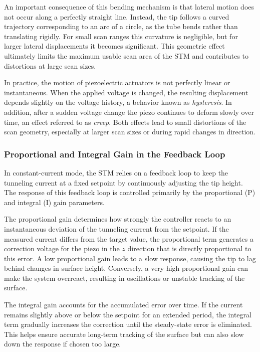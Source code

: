\documentclass[a4paper]{article}
\begin{document}
An important consequence of this bending mechanism is that lateral motion does not occur along a perfectly straight line.
Instead, the tip follows a curved trajectory corresponding to an arc of a circle, as the tube bends rather than translating rigidly.
For small scan ranges this curvature is negligible, but for larger lateral displacements it becomes significant.
This geometric effect ultimately limits the maximum usable scan area of the STM and contributes to distortions at large scan sizes.

In practice, the motion of piezoelectric actuators is not perfectly linear or instantaneous.
When the applied voltage is changed, the resulting displacement depends slightly on the voltage history, a behavior known as \emph{hysteresis}.
In addition, after a sudden voltage change the piezo continues to deform slowly over time, an effect referred to as \emph{creep}.
Both effects lead to small distortions of the scan geometry, especially at larger scan sizes or during rapid changes in direction.

\subsubsection{Proportional and Integral Gain in the Feedback Loop}

In constant-current mode, the STM relies on a feedback loop to keep the tunneling current at a fixed setpoint by continuously adjusting the tip height.
The response of this feedback loop is controlled primarily by the proportional (P) and integral (I) gain parameters.

The proportional gain determines how strongly the controller reacts to an instantaneous deviation of the tunneling current from the setpoint.
If the measured current differs from the target value, the proportional term generates a correction voltage for the piezo in the $z$ direction that is directly proportional to this error.
A low proportional gain leads to a slow response, causing the tip to lag behind changes in surface height.
Conversely, a very high proportional gain can make the system overreact, resulting in oscillations or unstable tracking of the surface.

The integral gain accounts for the accumulated error over time.
If the current remains slightly above or below the setpoint for an extended period, the integral term gradually increases the correction until the steady-state error is eliminated.
This helps ensure accurate long-term tracking of the surface but can also slow down the response if chosen too large.
\end{document}
